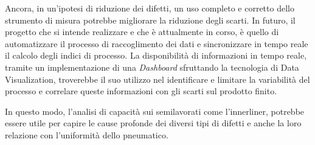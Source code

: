Ancora, in un'ipotesi di riduzione dei difetti, un uso completo e corretto dello strumento di misura potrebbe migliorare la riduzione degli scarti.
In futuro, il progetto che si intende realizzare e che è attualmente in corso, è quello di automatizzare il processo di raccoglimento dei dati e sincronizzare in tempo reale il calcolo degli indici di processo.
La disponibilità di informazioni in tempo reale, tramite un implementazione di una \textit{Dashboard} sfruttando la tecnologia di Data Visualization, troverebbe il suo utilizzo nel identificare e limitare la variabilità del processo e correlare queste informazioni con gli scarti sul prodotto finito. 

In questo modo, l'analisi di capacità sui semilavorati come l'innerliner, potrebbe essere utile per capire le cause profonde dei diversi tipi di difetti e anche la loro relazione con l'uniformità dello pneumatico.


